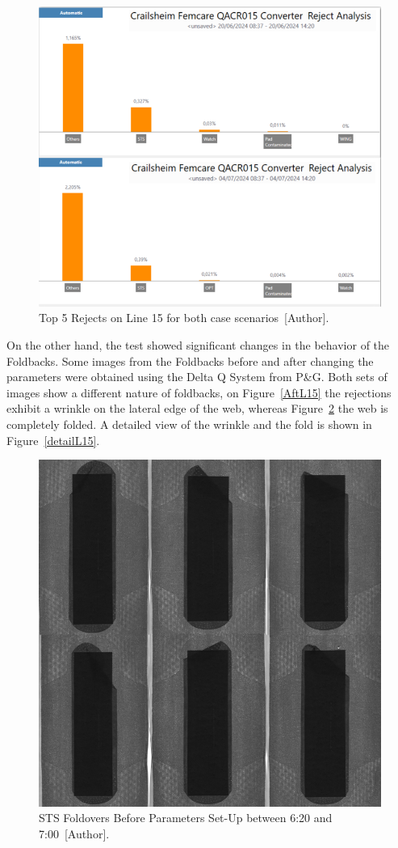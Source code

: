 \begin{figure}[H]
    \centering
    \includegraphics[width = 0.75\linewidth]{FIGURES/scrap2.png}
    \caption{Top 5 Rejects on Line 15 for both case scenarios~[Author].}
    \label{Scrap2}
\end{figure}
\clearpage

On the other hand, the test showed significant changes in the behavior of the Foldbacks. Some images from the Foldbacks before and after changing the parameters were obtained using the Delta Q System from P\&G. Both sets of images show a different nature of foldbacks, on Figure~\ref{AftL15} the rejections exhibit a wrinkle on the lateral edge of the web, whereas Figure~\ref{BefL15} the web is completely folded. A detailed view of the wrinkle and the fold is shown in Figure~\ref{detailL15}.

 \begin{figure}[H]
    \centering
    \includegraphics[width=0.5\linewidth]{FIGURES/L15FoldbacksBefore.png}
    \caption{STS Foldovers Before Parameters Set-Up between 6:20 and 7:00~[Author].}
    \label{BefL15}
\end{figure}

